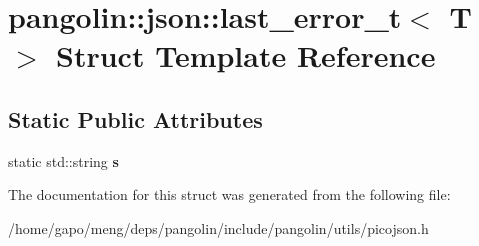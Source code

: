 \hypertarget{structpangolin_1_1json_1_1last__error__t}{}\section{pangolin\+:\+:json\+:\+:last\+\_\+error\+\_\+t$<$ T $>$ Struct Template Reference}
\label{structpangolin_1_1json_1_1last__error__t}
\subsection*{Static Public Attributes}
\begin{DoxyCompactItemize}
\item 
static std\+::string {\bfseries s}\hypertarget{structpangolin_1_1json_1_1last__error__t_ae8982a740d8bef01d589c7997baec5ef}{}\label{structpangolin_1_1json_1_1last__error__t_ae8982a740d8bef01d589c7997baec5ef}

\end{DoxyCompactItemize}


The documentation for this struct was generated from the following file\+:\begin{DoxyCompactItemize}
\item 
/home/gapo/meng/deps/pangolin/include/pangolin/utils/picojson.\+h\end{DoxyCompactItemize}
